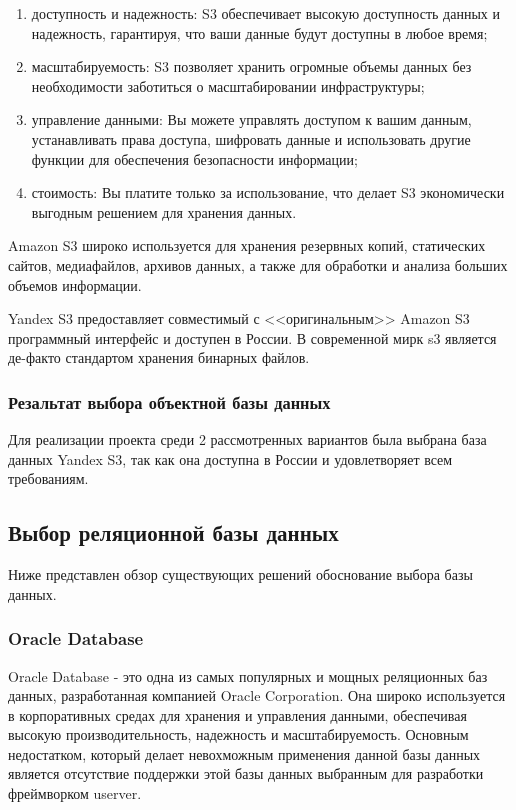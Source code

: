 \begin{enumerate}
	
	\item доступность и надежность: S3 обеспечивает высокую доступность данных и надежность, гарантируя, что ваши данные будут доступны в любое время;
	
	\item масштабируемость: S3 позволяет хранить огромные объемы данных без необходимости заботиться о масштабировании инфраструктуры;
	
	\item управление данными: Вы можете управлять доступом к вашим данным, устанавливать права доступа, шифровать данные и использовать другие функции для обеспечения безопасности информации;
	
	\item стоимость: Вы платите только за использование, что делает S3 экономически выгодным решением для хранения данных.
\end{enumerate}

Amazon S3 широко используется для хранения резервных копий, статических сайтов, медиафайлов, архивов данных, а также для обработки и анализа больших объемов информации.

Yandex S3 предоставляет совместимый с <<оригинальным>> Amazon S3 программный интерфейс и доступен в России. В современной мирк s3 является де-факто стандартом хранения бинарных файлов.

\subsubsection{Резальтат выбора объектной базы данных}

Для реализации проекта среди 2 рассмотренных вариантов была выбрана база данных Yandex S3, так как она доступна в России и удовлетворяет всем требованиям.


\subsection{Выбор реляционной базы данных}

Ниже представлен обзор существующих решений обоснование выбора базы данных.

\subsubsection{Oracle Database}

Oracle Database - это одна из самых популярных и мощных реляционных баз данных, разработанная компанией Oracle Corporation. Она широко используется в корпоративных средах для хранения и управления данными, обеспечивая высокую производительность, надежность и масштабируемость. Основным недостатком, который делает невохможным применения данной базы данных является отсутствие поддержки этой базы данных выбранным для разработки фреймворком userver.


